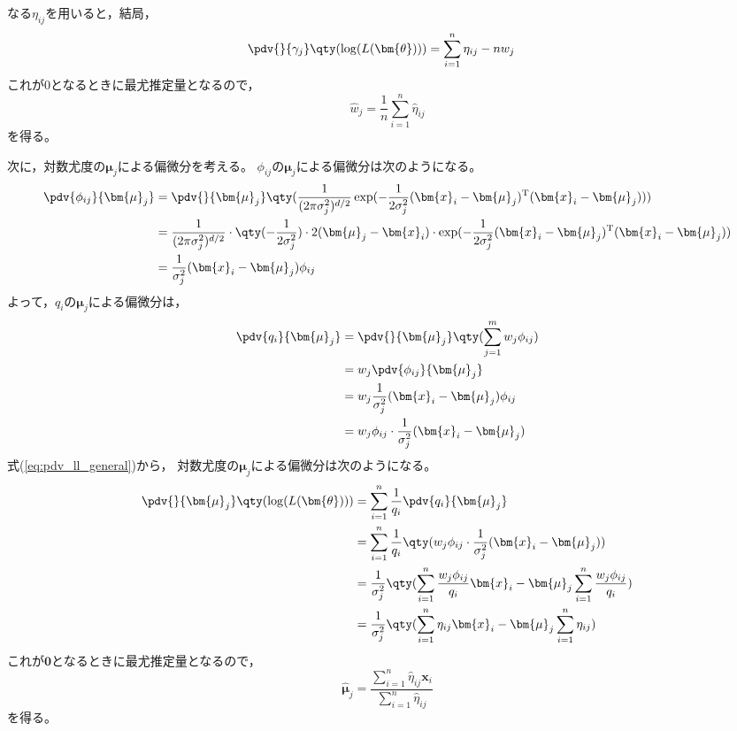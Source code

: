 \documentclass[class=jsarticle, crop=false, dvipdfmx, fleqn]{standalone}
\begin{document}
なる\(\eta_{ij}\)を用いると，結局，
\begin{align}
    \pdv{}{\gamma_j} \qty(\log(L(\bm{\theta})))
        & = \sum_{i=1}^{n} \eta_{ij} - n w_j
\end{align}
これが0となるときに最尤推定量となるので，
\begin{equation}
    \hat{w}_j = \frac{1}{n} \sum_{i=1}^{n} \hat{\eta}_{ij}
        \label{eq:gamma_mle}
\end{equation}
を得る。

次に，対数尤度の\(\bm{\mu}_j\)による偏微分を考える。
\(\phi_{ij}\)の\(\bm{\mu}_j\)による偏微分は次のようになる。
\begin{align}
    \pdv{\phi_{ij}}{\bm{\mu}_j}
        & = \pdv{}{\bm{\mu}_j} \qty(\frac{1}{(2\pi\sigma_j^2)^{d/2}} \exp(-\frac{1}{2\sigma_j^2} (\bm{x}_i-\bm{\mu}_j)^\mathrm{T}(\bm{x}_i-\bm{\mu}_j))) \\
        & = \frac{1}{(2\pi\sigma_j^2)^{d/2}} \cdot \qty(-\frac{1}{2\sigma_j^2}) \cdot 2(\bm{\mu}_j - \bm{x}_i) \cdot \exp(-\frac{1}{2\sigma_j^2} (\bm{x}_i-\bm{\mu}_j)^\mathrm{T}(\bm{x}_i-\bm{\mu}_j)) \\
        & = \frac{1}{\sigma_j^2} (\bm{x}_i-\bm{\mu}_j) \phi_{ij}
\end{align}
よって，\(q_i\)の\(\bm{\mu}_j\)による偏微分は，
\begin{align}
    \pdv{q_i}{\bm{\mu}_j}
        & = \pdv{}{\bm{\mu}_j} \qty(\sum_{j=1}^{m} w_j \phi_{ij}) \\
        & = w_j \pdv{\phi_{ij}}{\bm{\mu}_j} \\
        & = w_j \frac{1}{\sigma_j^2} (\bm{x}_i-\bm{\mu}_j) \phi_{ij} \\
        & = w_j \phi_{ij} \cdot \frac{1}{\sigma_j^2} (\bm{x}_i-\bm{\mu}_j)
\end{align}
式(\ref{eq:pdv_ll_general})から，
対数尤度の\(\bm{\mu}_j\)による偏微分は次のようになる。
\begin{align}
    \pdv{}{\bm{\mu}_j} \qty(\log(L(\bm{\theta})))
        & = \sum_{i=1}^{n} \frac{1}{q_i} \pdv{q_i}{\bm{\mu}_j} \\
        & = \sum_{i=1}^{n} \frac{1}{q_i} \qty(w_j \phi_{ij} \cdot \frac{1}{\sigma_j^2} (\bm{x}_i-\bm{\mu}_j)) \\
        & = \frac{1}{\sigma_j^2} \qty(\sum_{i=1}^{n} \frac{w_j \phi_{ij}}{q_i} \bm{x}_i - \bm{\mu}_j \sum_{i=1}^{n} \frac{w_j \phi_{ij}}{q_i}) \\
        & = \frac{1}{\sigma_j^2} \qty(\sum_{i=1}^{n} \eta_{ij} \bm{x}_i - \bm{\mu}_j \sum_{i=1}^{n} \eta_{ij})
\end{align}
これが\(\bm{0}\)となるときに最尤推定量となるので，
\begin{equation}
    \hat{\bm{\mu}}_j = \frac{\sum_{i=1}^{n} \hat{\eta}_{ij} \bm{x}_i}{\sum_{i=1}^{n} \hat{\eta}_{ij}}
        \label{eq:mu_mle}
\end{equation}
を得る。
\end{document}
